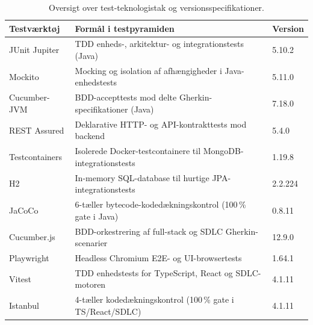 \documentclass[11pt,a4paper]{article}
\begin{document}
\begin{table}[H]
\centering
\small
\begin{tabularx}{\textwidth}{P{3.0cm} Y P{1.7cm}}
\toprule
\textbf{Testværktøj} & \textbf{Formål i testpyramiden} & \textbf{Version} \\
\midrule
JUnit Jupiter & TDD enheds-, arkitektur- og integrationstests (Java) & 5.10.2 \\
\midrule
Mockito & Mocking og isolation af afhængigheder i Java-enhedstests & 5.11.0 \\
\midrule
Cucumber-JVM & BDD-accepttests mod delte Gherkin-specifikationer (Java) & 7.18.0 \\
\midrule
REST Assured & Deklarative HTTP- og API-kontrakttests mod backend & 5.4.0 \\
\midrule
Testcontainers & Isolerede Docker-testcontainere til MongoDB-integrationstests & 1.19.8 \\
\midrule
H2 & In-memory SQL-database til hurtige JPA-integrationstests & 2.2.224 \\
\midrule
JaCoCo & 6-tæller bytecode-kodedækningskontrol (100\,\% gate i Java) & 0.8.11 \\
\midrule
Cucumber.js & BDD-orkestrering af full-stack og SDLC Gherkin-scenarier & 12.9.0 \\
\midrule
Playwright & Headless Chromium E2E- og UI-browsertests & 1.64.1 \\
\midrule
Vitest & TDD enhedstests for TypeScript, React og SDLC-motoren & 4.1.11 \\
\midrule
Istanbul & 4-tæller kodedækningskontrol (100\,\% gate i TS/React/SDLC) & 4.1.11 \\
\bottomrule
\end{tabularx}
\caption{Oversigt over test-teknologistak og versionsspecifikationer.}
\label{tab:test_stack}
\end{table}
\end{document}
